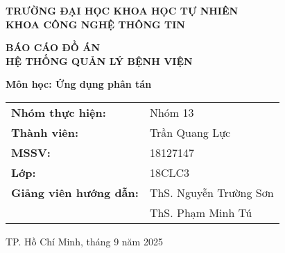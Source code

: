 \documentclass[12pt,a4paper]{report}
\begin{document}
    \begin{titlepage}
        \centering
        \vspace*{1cm}
        
        {\Large\textbf{TRƯỜNG ĐẠI HỌC KHOA HỌC TỰ NHIÊN}}\\
        {\Large\textbf{KHOA CÔNG NGHỆ THÔNG TIN}}\\
        \vspace{1cm}
        \vspace{1cm}
        
        {\huge\textbf{BÁO CÁO ĐỒ ÁN}}\\
        \vspace{0.5cm}
        {\Large\textbf{HỆ THỐNG QUẢN LÝ BỆNH VIỆN}}\\
        \vspace{1cm}
        
        {\large\textbf{Môn học: Ứng dụng phân tán}}\\
        \vspace{2cm}
        
        \begin{tabular}{ll}
            \textbf{Nhóm thực hiện:} & Nhóm 13 \\
            \textbf{Thành viên:} & Trần Quang Lực \\
            \textbf{MSSV:} & 18127147 \\
            \textbf{Lớp:} & 18CLC3 \\
            \textbf{Giảng viên hướng dẫn:} & ThS. Nguyễn Trường Sơn \\
        & ThS. Phạm Minh Tú \\
        \end{tabular}
        
        \vfill
        {\large TP. Hồ Chí Minh, tháng 9 năm 2025}
    \end{titlepage}
\end{document}
